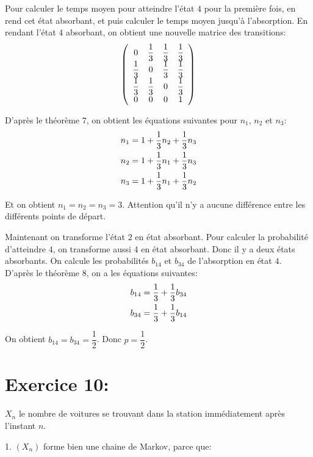 \documentclass[a4paper,twoside,12pt]{article}
\begin{document}
Pour calculer le temps moyen pour atteindre l'état $4$ pour la première fois, en rend cet état absorbant, et puis calculer le temps moyen jusqu'à l'absorption. En rendant l'état $4$ absorbant, on obtient une nouvelle matrice des transitions:
\begin{align}
    \left(\begin{array}{cccc}
        0 & \dfrac{1}{3} & \dfrac{1}{3} & \dfrac{1}{3} \\
        \dfrac{1}{3} & 0 & \dfrac{1}{3} & \dfrac{1}{3} \\
        \dfrac{1}{3} & \dfrac{1}{3} & 0 & \dfrac{1}{3} \\
        0 & 0 & 0 & 1
    \end{array}\right) \notag
\end{align}

D'après le théorème $7$, on obtient les équations suivantes pour $n_1$, $n_2$ et $n_3$:
\begin{align}
    n_1 &= 1+\dfrac{1}{3}n_2 + \dfrac{1}{3}n_3 \notag \\
    n_2 &= 1+\dfrac{1}{3}n_1 + \dfrac{1}{3}n_3\notag \\
    n_3 &= 1 + \dfrac{1}{3}n_1 + \dfrac{1}{3}n_2 \notag
\end{align}

Et on obtient $n_1 = n_2 = n_3 = 3$. Attention qu'il n'y a aucune différence entre les différents points de départ.

Maintenant on transforme l'état $2$ en état absorbant. Pour calculer la probabilité d'atteindre $4$, on transforme aussi $4$ en état absorbant. Donc il y a deux états absorbants. On calcule les probabilités $b_{14}$ et $b_{34}$ de l'absorption en état $4$. D'après le théorème $8$, on a les équations suivantes:
\begin{align}
    b_{14} &= \dfrac{1}{3} + \dfrac{1}{3}b_{34}\notag \\
    b_{34} &= \dfrac{1}{3} + \dfrac{1}{3}b_{14}\notag
\end{align}

On obtient $b_{14} = b_{34} = \dfrac{1}{2}$. Donc $p = \dfrac{1}{2}$.

\section{Exercice 10:}
$X_n$ le nombre de voitures se trouvant dans la station immédiatement après l'instant $n$.

1. $(X_n)$ forme bien une chaine de Markov, parce que:
\end{document}
